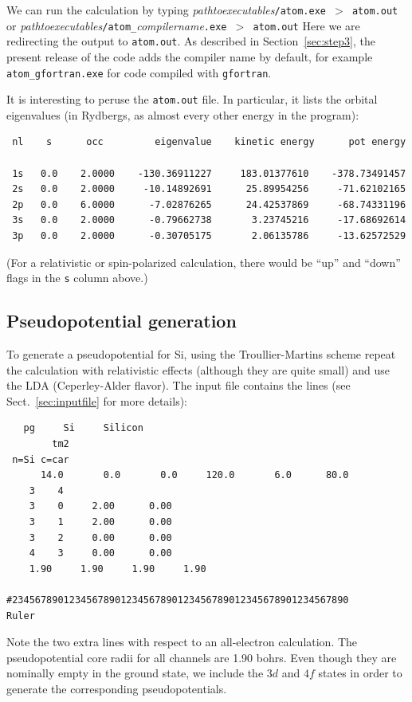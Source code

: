 \documentclass[11pt]{article}
\begin{document}
We can run the calculation by typing
\textit{pathtoexecutables}\texttt{/atom.exe $>$ atom.out}
or \textit{pathtoexecutables}\texttt{/atom\_}\textit{compilername}\texttt{.exe $>$ atom.out}
Here we are redirecting the output to \texttt{atom.out}.
As described in Section~\ref{sec:step3}, the present release of the code adds
the compiler name by default, for example \texttt{atom\_gfortran.exe} for code compiled
with \texttt{gfortran}.

It is interesting to peruse the \texttt{atom.out} file.
In particular, it lists the orbital eigenvalues (in Rydbergs, as almost
every other energy in the program):

\begin{verbatim}
 nl    s      occ         eigenvalue    kinetic energy      pot energy

 1s   0.0    2.0000    -130.36911227     183.01377610    -378.73491457
 2s   0.0    2.0000     -10.14892691      25.89954256     -71.62102165
 2p   0.0    6.0000      -7.02876265      24.42537869     -68.74331196
 3s   0.0    2.0000      -0.79662738       3.23745216     -17.68692614
 3p   0.0    2.0000      -0.30705175       2.06135786     -13.62572529
\end{verbatim}

(For a relativistic or spin-polarized calculation, there would be
``up'' and ``down'' flags in the {\tt s} column above.)

\subsection{Pseudopotential generation}
\label{sec:atomdat-pg}

To generate a pseudopotential for Si, using
the Troullier-Martins scheme repeat the calculation with relativistic
effects (although they are quite small) and
use the LDA (Ceperley-Alder flavor). The input file
contains the lines (see Sect.~\ref{sec:inputfile} for more
details):

\begin{verbatim}
   pg     Si     Silicon
        tm2
 n=Si c=car
      14.0       0.0       0.0     120.0       6.0      80.0
    3    4
    3    0     2.00      0.00
    3    1     2.00      0.00
    3    2     0.00      0.00
    4    3     0.00      0.00
    1.90     1.90     1.90     1.90

#23456789012345678901234567890123456789012345678901234567890      Ruler
\end{verbatim}

Note the two extra lines with respect to an all-electron calculation.
The pseudopotential core radii for all channels are 1.90 bohrs. Even
though they are nominally empty in the ground state, we include the
$3d$ and $4f$ states in order to generate the corresponding
pseudopotentials.
\end{document}
